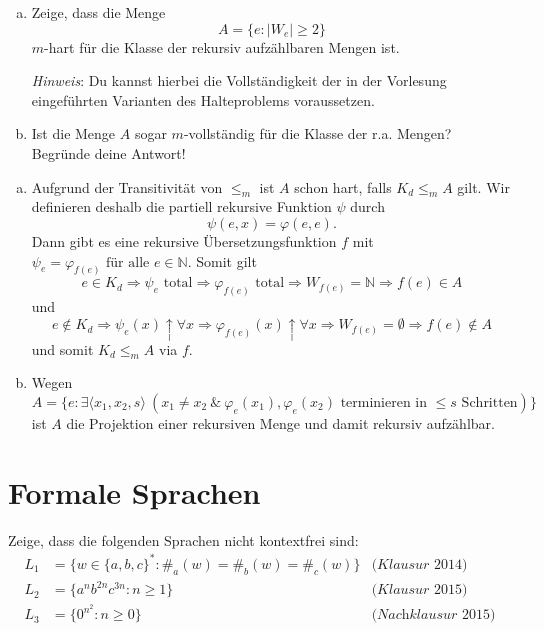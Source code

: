 \documentclass[german,headsepline]{scrartcl}
\theoremstyle{definition}
\begin{document}
	\begin{question}[subtitle={Klausur 2009}]
		\begin{enumerate}[(a)]
			\item Zeige, dass die Menge
				\[A=\{e\colon\vert W_e\vert\geq2\}\]
				$m$-hart für die Klasse der rekursiv aufzählbaren Mengen ist.
			
				\textit{Hinweis}: Du kannst hierbei die Vollständigkeit der in der Vorlesung eingeführten Varianten des Halteproblems voraussetzen.
			\item Ist die Menge $A$ sogar $m$-vollständig für die Klasse der r.a. Mengen? Begründe deine Antwort!
		\end{enumerate}
	\end{question}
	\begin{solution}
		\begin{enumerate}[(a)]
			\item Aufgrund der Transitivität von $\leq_m$ ist $A$ schon hart, falls $K_d\leq_mA$ gilt.
				Wir definieren deshalb die partiell rekursive Funktion $\psi$ durch
				\[\psi(e,x)=\varphi(e,e).\]
				Dann gibt es eine rekursive Übersetzungsfunktion $f$ mit
				$\psi_e=\varphi_{f(e)}\text{ für alle }e\in\mathbb{N}$.
				Somit gilt
				\[e\in K_d\Rightarrow\psi_e\text{ total}\Rightarrow\varphi_{f(e)}\text{ total}
				\Rightarrow W_{f(e)}=\mathbb{N}\Rightarrow f(e)\in A\]
				und
				\[e\notin K_d\Rightarrow\psi_e(x)\uparrow\forall x\Rightarrow\varphi_{f(e)}(x)\uparrow\forall x
				\Rightarrow W_{f(e)}=\emptyset\Rightarrow f(e)\notin A\]
				und somit $K_d\leq_mA$ via $f$.
			\item Wegen
				\[A=\{e\colon\exists\langle x_1,x_2,s\rangle~(x_1\neq x_2~\&~\varphi_e(x_1),\varphi_e(x_2)\text{ terminieren in $\leq s$ Schritten})\}\]
				ist $A$ die Projektion einer rekursiven Menge und damit rekursiv aufzählbar.
		\end{enumerate}
	\end{solution}
	
	\section{Formale Sprachen}
	\begin{question}
		Zeige, dass die folgenden Sprachen nicht kontextfrei sind:
		\begin{align*}
			L_1 &= \{w\in\{a,b,c\}^*\colon \#_a(w)=\#_b(w)=\#_c(w)\} & \textit{(Klausur 2014)} \\
			L_2 &= \{a^nb^{2n}c^{3n}\colon n\geq1\} & \textit{(Klausur 2015)} \\
			L_3 &= \{0^{n^2}\colon n\geq0\} & \textit{(Nachklausur 2015)}
		\end{align*}
	\end{question}
	
\end{document}

